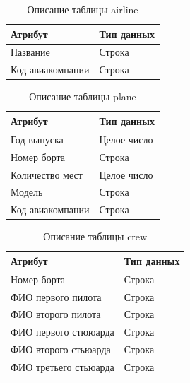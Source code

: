 \begin{table}[H]
    \centering
    \captionsetup{justification=centering}
    \caption{Описание таблицы airline}
    \begin{tabular}{|p{}|p{}|}
        \hline
        Атрибут & Тип данных \\
        \hline
        Название & Строка \\
        Код авиакомпании & Строка \\
        \hline
    \end{tabular}
    \label{tab:tabl4}
\end{table}

\begin{table}[H]
    \centering
    \captionsetup{justification=centering}
    \caption{Описание таблицы plane}
    \begin{tabular}{|p{}|p{}|}
        \hline
        Атрибут & Тип данных \\
        \hline
        Год выпуска & Целое число \\
        Номер борта & Строка \\
        Количество мест & Целое число \\
        Модель & Строка \\
        Код авиакомпании & Строка \\
        \hline
    \end{tabular}
    \label{tab:tabl5}
\end{table}

\begin{table}[H]
    \centering
    \captionsetup{justification=centering}
    \caption{Описание таблицы crew}
    \begin{tabular}{|p{}|p{}|}
        \hline
        Атрибут & Тип данных \\
        \hline
        Номер борта & Строка \\
        ФИО первого пилота & Строка \\
        ФИО второго пилота & Строка \\
        ФИО первого стююарда & Строка \\
        ФИО второго стьюарда & Строка \\
        ФИО третьего стьюарда & Строка \\
        \hline
    \end{tabular}
    \label{tab:tabl6}
\end{table}

